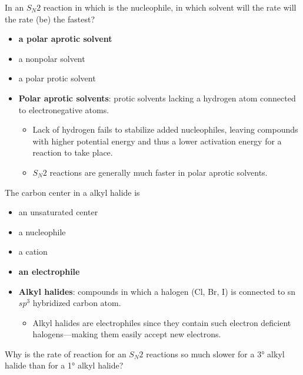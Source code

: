 \documentclass[12pt,a4paper]{article}
\begin{document}
\begin{enumerate}
    {\color{G-Moon}\item In an \(S_N2\) reaction in which  is the nucleophile, in which solvent will the rate will the rate (be) the fastest?
    \begin{itemize}
        \item {\color{o-Sun}\textbf{a polar aprotic solvent}}
        \item a nonpolar solvent
        \item a polar protic solvent
    \end{itemize}
    }
    \begin{itemize}
        \item \textbf{Polar aprotic solvents}: protic solvents lacking a hydrogen atom connected to electronegative atoms.
        \begin{itemize}
            \item Lack of hydrogen {\color{o-Sun}fails to stabilize added nucleophiles}, leaving compounds with higher potential energy and thus a {\color{o-Sun}lower activation energy} for a reaction to take place.
            \item \(S_N2\) reactions are generally much {\color{o-Sun}faster in polar aprotic solvents}.
        \end{itemize}
    \end{itemize}
    {\color{G-Moon}\item The carbon center in a alkyl halide is
    \begin{itemize}
        \item an unsaturated center
        \item a nucleophile
        \item a cation
        \item {\color{o-Sun}\textbf{an electrophile}}
    \end{itemize}
    }
    \begin{itemize}
        \item \textbf{Alkyl halides}: compounds in which a halogen (Cl, Br, I) is connected to sn \(sp^3\) hybridized carbon atom.
        \begin{itemize}
            \item Alkyl halides are electrophiles since they contain such electron deficient halogens---making them easily accept new electrons.
        \end{itemize}
    \end{itemize}
    {\color{G-Moon}\item Why is the rate of reaction for an \(S_N2\) reactions so much slower for a \ang{3} alkyl halide than for a \ang{1} alkyl halide?
}
\end{enumerate}
\end{document}
